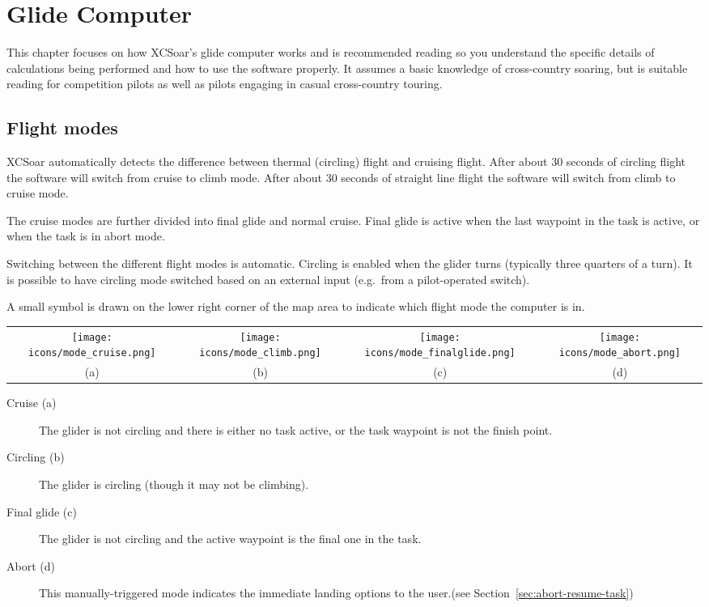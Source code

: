 \chapter{Glide Computer}\label{cha:glide}
This chapter focuses on how XCSoar's glide computer works and is
recommended reading so you understand the specific details of
calculations being performed and how to use the software properly.  It
assumes a basic knowledge of cross-country soaring, but is suitable
reading for competition pilots as well as pilots engaging in casual
cross-country touring.

\section{Flight modes} 
XCSoar automatically detects the difference between thermal (circling)
flight and cruising flight. After about 30 seconds of circling flight
the software will switch from cruise to climb mode. After about 30
seconds of straight line flight the software will switch from climb to
cruise mode.

The cruise modes are further divided into final glide and normal
cruise.  Final glide is active when the last waypoint in the task is
active, or when the task is in abort mode.

Switching between the different flight modes is automatic.  Circling
is enabled when the glider turns (typically three quarters of a turn).
It is possible to have circling mode switched based on an external
input (e.g.\ from a pilot-operated switch).

A small symbol is drawn on the lower right corner of the map area to
indicate which flight mode the computer is in.

\begin{tabular}{c c c c}%
\texttt{[image: icons/mode\_cruise.png]} &
\texttt{[image: icons/mode\_climb.png]} &
\texttt{[image: icons/mode\_finalglide.png]} &
\texttt{[image: icons/mode\_abort.png]}\\
(a) & (b) & (c) & (d)
\end{tabular}

\begin{description}
\item[Cruise (a)]   The glider is not circling and there is either no task
  active, or the task waypoint is not the finish point.
\item[Circling (b)]  The glider is circling (though it may not be climbing).
\item[Final glide (c)]  The glider is not circling and the active waypoint is the
 final one in the task.
\item[Abort (d)]  This manually-triggered mode indicates the immediate landing
options to the user.(see Section~\ref{sec:abort-resume-task})
\end{description}

